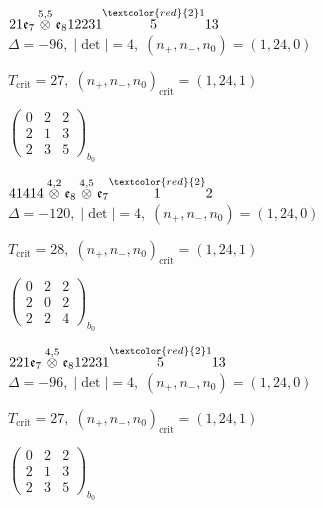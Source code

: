 \documentclass[10pt]{article}
\begin{document}
$21\mathfrak{e}_7\overset{5,5}{\otimes}\mathfrak{e}_812231\overset{\textcolor{red}{2}1}{5}13$ \quad $\Delta=-96,\; |\det|=4,\; (n_+,n_-,n_0)=(1,24,0)$

\hspace{1em}$T_{\text{crit}}=27,\; (n_+,n_-,n_0)_{\text{crit}}=(1,24,1)$

\hspace{2em}$\left(\begin{smallmatrix}0 & 2 & 2 \\ 2 & 1 & 3 \\ 2 & 3 & 5\end{smallmatrix}\right)_{\!b_0}$

\smallskip

$41414\overset{4,2}{\otimes}\mathfrak{e}_8\overset{4,5}{\otimes}\mathfrak{e}_7\overset{\textcolor{red}{2}}{1}2$ \quad $\Delta=-120,\; |\det|=4,\; (n_+,n_-,n_0)=(1,24,0)$

\hspace{1em}$T_{\text{crit}}=28,\; (n_+,n_-,n_0)_{\text{crit}}=(1,24,1)$

\hspace{2em}$\left(\begin{smallmatrix}0 & 2 & 2 \\ 2 & 0 & 2 \\ 2 & 2 & 4\end{smallmatrix}\right)_{\!b_0}$

\smallskip

$221\mathfrak{e}_7\overset{4,5}{\otimes}\mathfrak{e}_812231\overset{\textcolor{red}{2}1}{5}13$ \quad $\Delta=-96,\; |\det|=4,\; (n_+,n_-,n_0)=(1,24,0)$

\hspace{1em}$T_{\text{crit}}=27,\; (n_+,n_-,n_0)_{\text{crit}}=(1,24,1)$

\hspace{2em}$\left(\begin{smallmatrix}0 & 2 & 2 \\ 2 & 1 & 3 \\ 2 & 3 & 5\end{smallmatrix}\right)_{\!b_0}$

\smallskip
\end{document}
